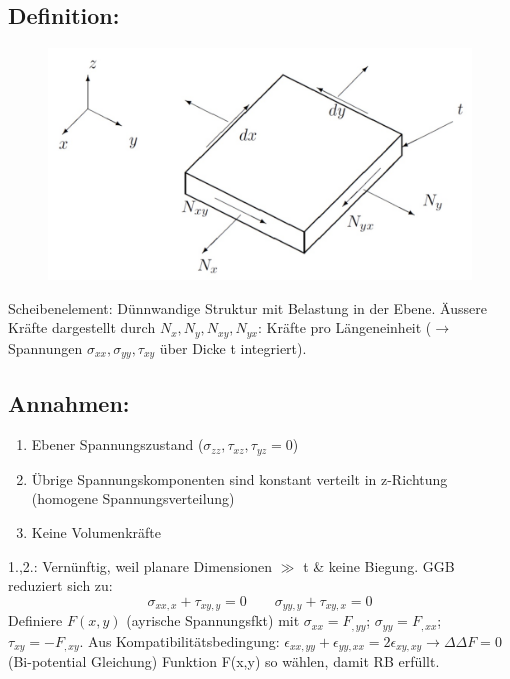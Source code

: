 \documentclass[a4paper,10pt]{article}
\begin{document}
\begin{multicols*}{3}
    \subsection{Definition:}
        \begin{figure}
        \includegraphics[width=\linewidth]{Balkenelement.jpeg}
        \end{figure}
        Scheibenelement: Dünnwandige Struktur mit Belastung in der Ebene. Äussere Kräfte dargestellt durch $N_x,N_y,N_{xy},N_{yx}$: Kräfte pro Längeneinheit ($\rightarrow$ Spannungen $\sigma_{xx},\sigma_{yy},\tau_{xy}$ über Dicke t integriert).
        
    \subsection{Annahmen:}
        \begin{enumerate}[noitemsep]
            \item Ebener Spannungszustand ($\sigma_{zz},\tau_{xz},\tau_{yz}=0$)
            \item Übrige Spannungskomponenten sind konstant verteilt in z-Richtung (homogene Spannungsverteilung)
            \item Keine Volumenkräfte
        \end{enumerate}
        1.,2.: Vernünftig, weil planare Dimensionen $\gg$ t \& keine Biegung. GGB reduziert sich zu:
        \[\sigma_{xx,x} + \tau_{xy,y}=0\quad\quad\sigma_{yy,y} + \tau_{xy,x}=0\]
        Definiere $F(x,y)$ (ayrische Spannungsfkt) mit $\sigma_{xx}=F_{,yy}$; $\sigma_{yy}=F_{,xx}$; $\tau_{xy}=-F_{,xy}$. Aus Kompatibilitätsbedingung: $\epsilon_{xx,yy}+\epsilon_{yy,xx}=2\epsilon_{xy,xy} \rightarrow \Delta\Delta F=0$ (Bi-potential Gleichung) Funktion F(x,y) so wählen, damit RB erfüllt.

\end{multicols*}
\end{document}
